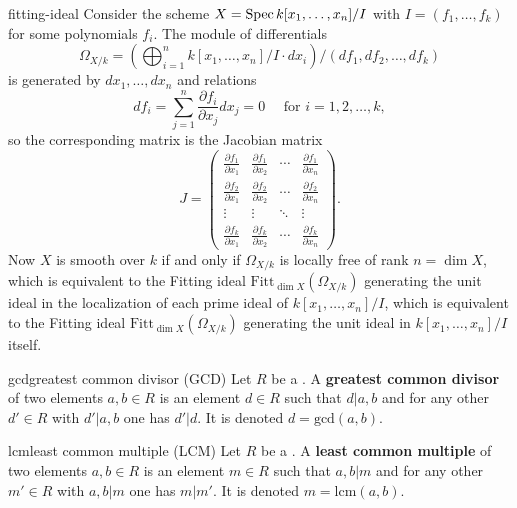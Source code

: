 \begin{example}{fitting-ideal}
    Consider the scheme $X = \operatorname{Spec} k[x_1, \ldots, x_n] / I$ with $I = (f_1, \ldots, f_k)$ for some polynomials $f_i$. The module of differentials
    \[ \Omega_{X/k} = \left(\bigoplus_{i = 1}^{n} k[x_1, \ldots, x_n] / I \cdot dx_i \right) / (df_1, df_2, \ldots, df_k) \]
    is generated by $dx_1, \ldots, dx_n$ and relations
    \[ df_i = \sum_{j = 1}^{n} \frac{\partial f_i}{\partial x_j} dx_j = 0 \quad \text{ for } i = 1, 2, \ldots, k , \]
    so the corresponding matrix is the Jacobian matrix
    \[ J = \begin{pmatrix}
        \frac{\partial f_1}{\partial x_1} & \frac{\partial f_1}{\partial x_2} & \cdots & \frac{\partial f_1}{\partial x_n} \\
        \frac{\partial f_2}{\partial x_1} & \frac{\partial f_2}{\partial x_2} & \cdots & \frac{\partial f_2}{\partial x_n} \\
        \vdots & \vdots & \ddots & \vdots \\
        \frac{\partial f_k}{\partial x_1} & \frac{\partial f_k}{\partial x_2} & \cdots & \frac{\partial f_k}{\partial x_n}
    \end{pmatrix} . \]
    Now $X$ is smooth over $k$ if and only if $\Omega_{X/k}$ is locally free of rank $n = \dim X$, which is equivalent to the Fitting ideal $\text{Fitt}_{\dim X}(\Omega_{X/k})$ generating the unit ideal in the localization of each prime ideal of $k[x_1, \ldots, x_n] / I$, which is equivalent to the Fitting ideal $\text{Fitt}_{\dim X}(\Omega_{X/k})$ generating the unit ideal in $k[x_1, \ldots, x_n] / I$ itself.
\end{example}

\begin{topic}{gcd}{greatest common divisor (GCD)}
    Let $R$ be a . A \textbf{greatest common divisor} of two elements $a, b \in R$ is an element $d \in R$ such that $d | a, b$ and for any other $d' \in R$ with $d' | a, b$ one has $d' | d$. It is denoted $d = \text{gcd}(a, b)$.
\end{topic}

\begin{topic}{lcm}{least common multiple (LCM)}
    Let $R$ be a . A \textbf{least common multiple} of two elements $a, b \in R$ is an element $m \in R$ such that $a, b | m$ and for any other $m' \in R$ with $a, b | m$ one has $m | m'$. It is denoted $m = \text{lcm}(a, b)$.
\end{topic}

